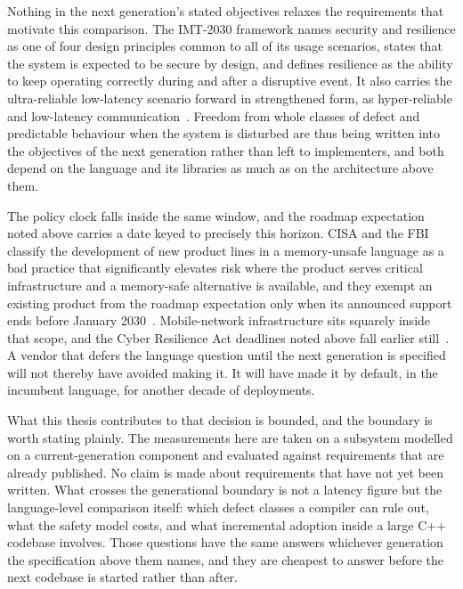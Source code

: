 \documentclass[english,twoside,openright,a4paper,censored,csm,software-track-2020]{HYthesisML}
\begin{document}
Nothing in the next generation's stated objectives relaxes the requirements that motivate this
comparison. The IMT-2030 framework names security and resilience as one of four design principles common to
all of its usage scenarios, states that the system is expected to be secure by design, and
defines resilience as the ability to keep operating correctly during and after a disruptive
event. It also carries the ultra-reliable low-latency scenario forward in strengthened form, as
hyper-reliable and low-latency communication~\cite{itu2023imt2030}. Freedom from whole classes of
defect and predictable behaviour when the system is disturbed are thus being written into the
objectives of the next generation rather than left to implementers, and both depend on the
language and its libraries as much as on the architecture above them.

The policy clock falls inside the same window, and the roadmap expectation noted above carries a
date keyed to precisely this horizon. CISA and the FBI classify the development of new product
lines in a memory-unsafe language as a bad practice that significantly elevates risk where the
product serves critical infrastructure and a memory-safe alternative is available, and they
exempt an existing product from the roadmap expectation only when its announced support ends
before January 2030~\cite{cisa2025badpractices}. Mobile-network infrastructure sits squarely
inside that scope, and the Cyber Resilience Act deadlines noted above fall earlier
still~\cite{eu2024cra}. A vendor that defers the language question until the next generation is
specified will not thereby have avoided making it. It will have made it by default, in the
incumbent language, for another decade of deployments.

What this thesis contributes to that decision is bounded, and the boundary is worth stating
plainly. The measurements here are taken on a subsystem modelled on a current-generation
component and evaluated against requirements that are already published. No claim is made about
requirements that have not yet been written. What crosses the generational boundary is not a
latency figure but the language-level comparison itself: which defect classes a compiler can rule
out, what the safety model costs, and what incremental adoption inside a large C++ codebase
involves. Those questions have the same answers whichever generation the specification above them
names, and they are cheapest to answer before the next codebase is started rather than after.
\end{document}
